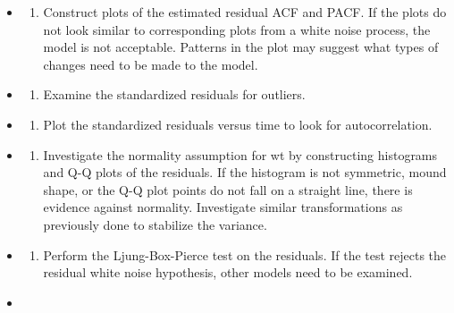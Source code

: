 \documentclass[
]{book}
\providecommand{\tightlist}{%
  \setlength{\itemsep}{0pt}\setlength{\parskip}{0pt}}
\theoremstyle{definition}
\theoremstyle{definition}
\theoremstyle{definition}
\theoremstyle{definition}
\theoremstyle{remark}
\begin{document}
\begin{itemize}
\item
  \begin{enumerate}
  \def\labelenumi{\alph{enumi}.}
  \tightlist
  \item
    Construct plots of the estimated residual ACF and PACF. If the plots do not look similar to corresponding plots from a white noise process, the model is not acceptable. Patterns in the plot may suggest what types of changes need to be made to the model.
  \end{enumerate}
\item
  \begin{enumerate}
  \def\labelenumi{\alph{enumi}.}
  \setcounter{enumi}{1}
  \tightlist
  \item
    Examine the standardized residuals for outliers.\\
  \end{enumerate}
\item
  \begin{enumerate}
  \def\labelenumi{\alph{enumi}.}
  \setcounter{enumi}{2}
  \tightlist
  \item
    Plot the standardized residuals versus time to look for autocorrelation.\\
  \end{enumerate}
\item
  \begin{enumerate}
  \def\labelenumi{\alph{enumi}.}
  \setcounter{enumi}{3}
  \tightlist
  \item
    Investigate the normality assumption for wt by constructing histograms and Q-Q plots of the residuals. If the histogram is not symmetric, mound shape, or the Q-Q plot points do not fall on a straight line, there is evidence against normality. Investigate similar transformations as previously done to stabilize the variance.
  \end{enumerate}
\item
  \begin{enumerate}
  \def\labelenumi{\alph{enumi}.}
  \setcounter{enumi}{4}
  \tightlist
  \item
    Perform the Ljung-Box-Pierce test on the residuals. If the test rejects the residual white noise hypothesis, other models need to be examined.\\
  \end{enumerate}
\item
  \begin{enumerate}
  \def\labelenumi{\alph{enumi}.}
  \setcounter{enumi}{5}
  \tightlist

\end{enumerate}
\end{itemize}
\end{document}
